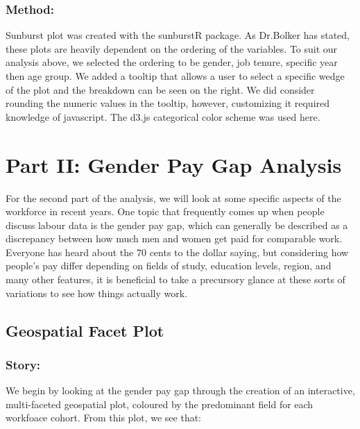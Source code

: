 \documentclass[]{article}
\begin{document}
\hypertarget{method-2}{%
\subsubsection{Method:}\label{method-2}}

Sunburst plot was created with the sunburstR package. As Dr.Bolker has
stated, these plots are heavily dependent on the ordering of the
variables. To suit our analysis above, we selected the ordering to be
gender, job tenure, specific year then age group. We added a tooltip
that allows a user to select a specific wedge of the plot and the
breakdown can be seen on the right. We did consider rounding the numeric
values in the tooltip, however, customizing it required knowledge of
javascript. The d3.js categorical color scheme was used here.

\hypertarget{part-ii-gender-pay-gap-analysis}{%
\section{Part II: Gender Pay Gap
Analysis}\label{part-ii-gender-pay-gap-analysis}}

For the second part of the analysis, we will look at some specific
aspects of the workforce in recent years. One topic that frequently
comes up when people discuss labour data is the gender pay gap, which
can generally be described as a discrepancy between how much men and
women get paid for comparable work. Everyone has heard about the 70
cents to the dollar saying, but considering how people's pay differ
depending on fields of study, education levels, region, and many other
features, it is beneficial to take a precursory glance at these sorts of
variations to see how things actually work.

\hypertarget{geospatial-facet-plot}{%
\subsection{Geospatial Facet Plot}\label{geospatial-facet-plot}}

\hypertarget{story-3}{%
\subsubsection{Story:}\label{story-3}}

We begin by looking at the gender pay gap through the creation of an
interactive, multi-faceted geospatial plot, coloured by the predominant
field for each workfoace cohort. From this plot, we see that:
\end{document}
